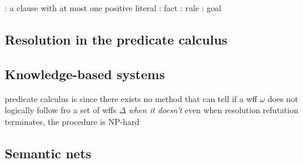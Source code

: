 \documentclass{note}
\begin{document}
	\eit
\w {}: a clause with at most one positive literal
	\bit
	\w {}: fact
	\w {}: rule
	\w {}: goal
	\eit
\eit

\subsection{Resolution in the predicate calculus}
\bit
\w {}
\eit
\subsection{Knowledge-based systems}
\bit
\w predicate calculus is  since there exists no
	method that can tell if a wff $\omega$ does not logically follow
	fro a set of wffs $\Delta$ {\em when it doesn't}
\w even when resolution refutation terminates, the procedure is NP-hard
\eit
\subsection{Semantic nets}
\end{document}
